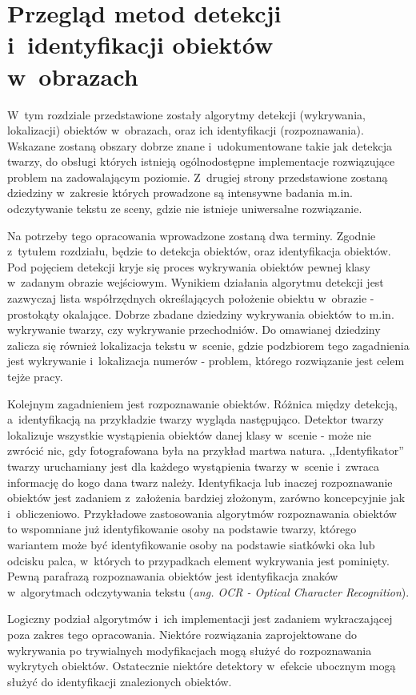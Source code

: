 \chapter{Przegląd metod detekcji i~identyfikacji obiektów w~obrazach}

W~tym rozdziale przedstawione zostały algorytmy detekcji (wykrywania,
lokalizacji) obiektów w~obrazach, oraz ich identyfikacji (rozpoznawania).
Wskazane zostaną obszary dobrze znane i~udokumentowane takie jak detekcja
twarzy, do obsługi których istnieją ogólnodostępne implementacje
rozwiązujące problem na zadowalającym poziomie. Z~drugiej strony
przedstawione zostaną dziedziny w~zakresie których prowadzone są intensywne
badania m.in. odczytywanie tekstu ze sceny, gdzie nie istnieje uniwersalne
rozwiązanie.

Na potrzeby tego opracowania wprowadzone zostaną dwa terminy. Zgodnie
z~tytułem rozdziału, będzie to detekcja obiektów, oraz identyfikacja
obiektów. Pod pojęciem detekcji kryje się proces wykrywania obiektów
pewnej klasy w~zadanym obrazie wejściowym. 
Wynikiem działania algorytmu detekcji jest zazwyczaj lista
współrzędnych określających położenie obiektu w~obrazie - prostokąty
okalające. Dobrze zbadane dziedziny wykrywania obiektów to m.in. 
wykrywanie twarzy, czy wykrywanie przechodniów. Do omawianej dziedziny
zalicza się również lokalizacja tekstu w~scenie, gdzie podzbiorem
tego zagadnienia jest wykrywanie i~lokalizacja numerów 
- problem, którego rozwiązanie jest celem tejże pracy.

Kolejnym zagadnieniem jest rozpoznawanie obiektów. Różnica między
detekcją, a~identyfikacją na przykładzie twarzy wygląda następująco.
Detektor twarzy lokalizuje wszystkie wystąpienia obiektów danej klasy
w~scenie - może nie zwrócić nic, gdy fotografowana była na przykład martwa
natura. ,,Identyfikator'' twarzy uruchamiany jest dla każdego wystąpienia
twarzy w~scenie i~zwraca informację do kogo dana twarz należy.
Identyfikacja lub inaczej rozpoznawanie obiektów jest zadaniem z~założenia
bardziej złożonym, zarówno koncepcyjnie jak i~obliczeniowo.
Przykładowe zastosowania algorytmów rozpoznawania obiektów to wspomniane
już identyfikowanie osoby na podstawie twarzy, którego wariantem może
być identyfikowanie osoby na podstawie siatkówki oka lub odcisku palca,
w~których to przypadkach element wykrywania jest pominięty. 
Pewną parafrazą
rozpoznawania obiektów jest identyfikacja znaków w~algorytmach odczytywania
tekstu (\textit{ang. OCR - Optical Character Recognition}).

Logiczny podział algorytmów i~ich implementacji jest zadaniem 
wykraczającej poza zakres tego opracowania. Niektóre rozwiązania
zaprojektowane do wykrywania po trywialnych modyfikacjach mogą służyć
do rozpoznawania wykrytych obiektów. Ostatecznie niektóre detektory
w~efekcie ubocznym mogą służyć do identyfikacji znalezionych obiektów.

